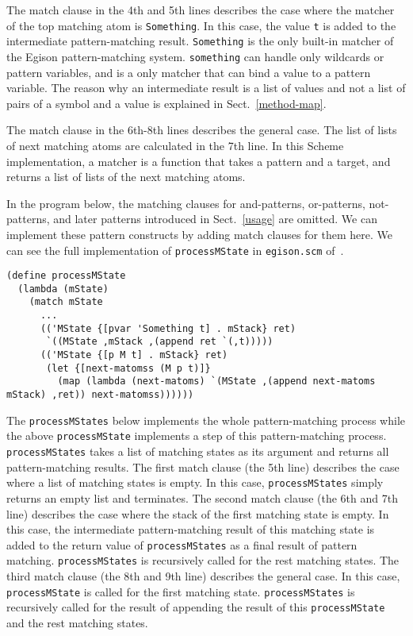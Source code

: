 \documentclass[acmlarge]{acmart}
\begin{document}
The match clause in the 4th and 5th lines describes the case where the matcher of the top matching atom is \texttt{Something}.
In this case, the value \texttt{t} is added to the intermediate pattern-matching result.
\texttt{Something} is the only built-in matcher of the Egison pattern-matching system.
\texttt{something} can handle only wildcards or pattern variables, and is a only matcher that can bind a value to a pattern variable.
The reason why an intermediate result is a list of values and not a list of pairs of a symbol and a value is explained in Sect.~\ref{method-map}.

The match clause in the 6th-8th lines describes the general case.
The list of lists of next matching atoms are calculated in the 7th line.
In this Scheme implementation, a matcher is a function that takes a pattern and a target, and returns a list of lists of the next matching atoms.

In the program below, the matching clauses for and-patterns, or-patterns, not-patterns, and later patterns introduced in Sect.~\ref{usage} are omitted.
We can implement these pattern constructs by adding match clauses for them here.
We can see the full implementation of \texttt{processMState} in \texttt{egison.scm} of~\cite{egisonScheme}.

\begin{lstlisting}[language=egison]
(define processMState
  (lambda (mState)
    (match mState
      ...
      (('MState {[pvar 'Something t] . mStack} ret)
       `((MState ,mStack ,(append ret `(,t)))))
      (('MState {[p M t] . mStack} ret)
       (let {[next-matomss (M p t)]}
         (map (lambda (next-matoms) `(MState ,(append next-matoms mStack) ,ret)) next-matomss))))))
\end{lstlisting}

\medskip

The \texttt{processMStates} below implements the whole pattern-matching process while the above \texttt{processMState} implements a step of this pattern-matching process.
\texttt{processMStates} takes a list of matching states as its argument and returns all pattern-matching results.
The first match clause (the 5th line) describes the case where a list of matching states is empty.
In this case, \texttt{processMStates} simply returns an empty list and terminates.
The second match clause (the 6th and 7th line) describes the case where the stack of the first matching state is empty.
In this case, the intermediate pattern-matching result of this matching state is added to the return value of \texttt{processMStates} as a final result of pattern matching.
\texttt{processMStates} is recursively called for the rest matching states.
The third match clause (the 8th and 9th line) describes the general case.
In this case, \texttt{processMState} is called for the first matching state.
\texttt{processMStates} is recursively called for the result of appending the result of this \texttt{processMState} and the rest matching states.
\end{document}
